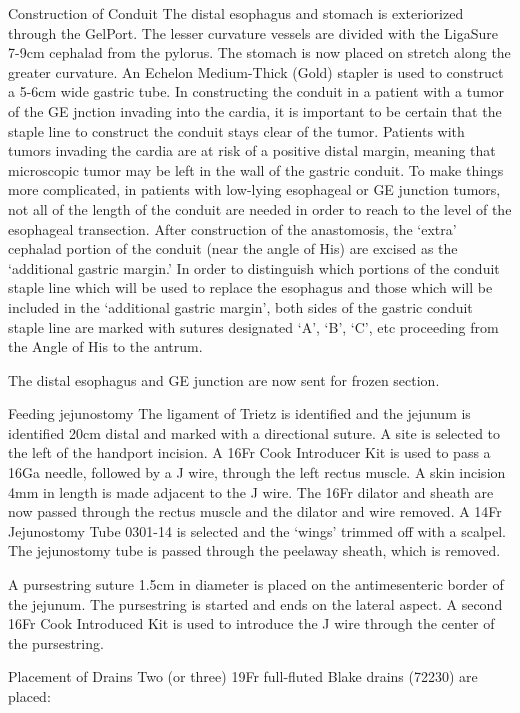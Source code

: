 \documentclass[
  letterpaper,
]{scrbook}
\begin{document}
Construction of Conduit The distal esophagus and stomach is exteriorized
through the GelPort. The lesser curvature vessels are divided with the
LigaSure 7-9cm cephalad from the pylorus. The stomach is now placed on
stretch along the greater curvature. An Echelon Medium-Thick (Gold)
stapler is used to construct a 5-6cm wide gastric tube. In constructing
the conduit in a patient with a tumor of the GE jnction invading into
the cardia, it is important to be certain that the staple line to
construct the conduit stays clear of the tumor. Patients with tumors
invading the cardia are at risk of a positive distal margin, meaning
that microscopic tumor may be left in the wall of the gastric conduit.
To make things more complicated, in patients with low-lying esophageal
or GE junction tumors, not all of the length of the conduit are needed
in order to reach to the level of the esophageal transection. After
construction of the anastomosis, the `extra' cephalad portion of the
conduit (near the angle of His) are excised as the `additional gastric
margin.' In order to distinguish which portions of the conduit staple
line which will be used to replace the esophagus and those which will be
included in the `additional gastric margin', both sides of the gastric
conduit staple line are marked with sutures designated `A', `B', `C',
etc proceeding from the Angle of His to the antrum.

The distal esophagus and GE junction are now sent for frozen section.

Feeding jejunostomy The ligament of Trietz is identified and the jejunum
is identified 20cm distal and marked with a directional suture. A site
is selected to the left of the handport incision. A 16Fr Cook Introducer
Kit is used to pass a 16Ga needle, followed by a J wire, through the
left rectus muscle. A skin incision 4mm in length is made adjacent to
the J wire. The 16Fr dilator and sheath are now passed through the
rectus muscle and the dilator and wire removed. A 14Fr Jejunostomy Tube
0301-14 is selected and the `wings' trimmed off with a scalpel. The
jejunostomy tube is passed through the peelaway sheath, which is
removed.

A pursestring suture 1.5cm in diameter is placed on the antimesenteric
border of the jejunum. The pursestring is started and ends on the
lateral aspect. A second 16Fr Cook Introduced Kit is used to introduce
the J wire through the center of the pursestring.

Placement of Drains Two (or three) 19Fr full-fluted Blake drains (72230)
are placed:
\end{document}
